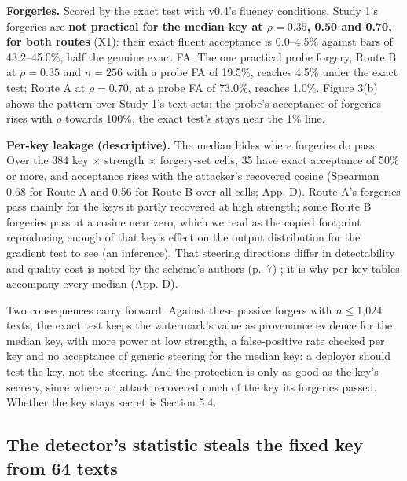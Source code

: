 \documentclass[11pt,letterpaper]{article}
\begin{document}
\textbf{Forgeries.} Scored by the exact test with v0.4's fluency conditions, Study 1's forgeries are \textbf{not practical for the median key at \(\rho = 0.35\), 0.50 and 0.70, for both routes} (X1): their exact fluent acceptance is 0.0--4.5\% against bars of 43.2--45.0\%, half the genuine exact FA. The one practical probe forgery, Route B at \(\rho = 0.35\) and \(n = 256\) with a probe FA of 19.5\%, reaches 4.5\% under the exact test; Route A at \(\rho = 0.70\), at a probe FA of 73.0\%, reaches 1.0\%. Figure 3(b) shows the pattern over Study 1's text sets: the probe's acceptance of forgeries rises with \(\rho\) towards 100\%, the exact test's stays near the 1\% line.

\textbf{Per-key leakage (descriptive).} The median hides where forgeries do pass. Over the 384 key \ensuremath{\times} strength \ensuremath{\times} forgery-set cells, 35 have exact acceptance of 50\% or more, and acceptance rises with the attacker's recovered cosine (Spearman 0.68 for Route A and 0.56 for Route B over all cells; App. D). Route A's forgeries pass mainly for the keys it partly recovered at high strength; some Route B forgeries pass at a cosine near zero, which we read as the copied footprint reproducing enough of that key's effect on the output distribution for the gradient test to see (an inference). That steering directions differ in detectability and quality cost is noted by the scheme's authors (p.~7) \citep{ardoin2026selfrecognition}; it is why per-key tables accompany every median (App. D).

Two consequences carry forward. Against these passive forgers with \(n \leq \text{1,024}\) texts, the exact test keeps the watermark's value as provenance evidence for the median key, with more power at low strength, a false-positive rate checked per key and no acceptance of generic steering for the median key: a deployer should test the key, not the steering. And the protection is only as good as the key's secrecy, since where an attack recovered much of the key its forgeries passed. Whether the key stays secret is Section 5.4.

\hypertarget{the-detectors-statistic-steals-the-fixed-key-from-64-texts}{%
\subsection{The detector's statistic steals the fixed key from 64 texts}\label{the-detectors-statistic-steals-the-fixed-key-from-64-texts}}
\end{document}
